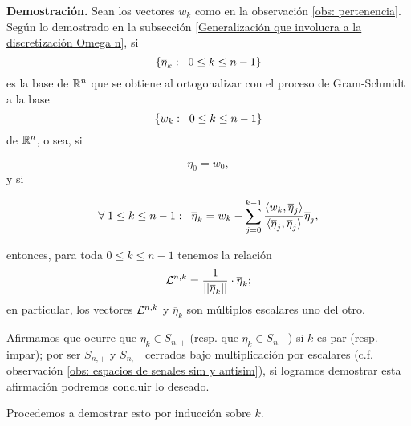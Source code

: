 \noindent
\textbf{Demostración.}
Sean los vectores $w_{k}$ como en la observación 
\ref{obs: pertenencia}.
Según lo demostrado en la subsección 
\ref{Generalización que involucra a la discretización Omega n}, si
\[
\{ \overline{\eta}_{k} : \hspace{0.2cm} 0 \leq k \leq n-1 \}
\]
es la base de $\mathbb{R}^{n}$ que se obtiene al ortogonalizar 
con el proceso de Gram-Schmidt a la base
\[
\{ w_{k} : \hspace{0.2cm} 0 \leq k \leq n-1 \}
\]
de $\mathbb{R}^{n}$,
o sea, si 

\begin{equation}
\label{eq3: 19En}
\overline{\eta}_{0}= w_{0},
\end{equation}
y si

\begin{equation}
\label{eq4: 19En}
\forall \hspace{0.1cm} 1 \leq k \leq n-1: 
\hspace{0.2cm}
\overline{\eta}_{k}= w_{k}-
\suma{j=0}{k-1}{
\frac{\langle w_{k}, \overline{\eta}_{j} \rangle}
{\langle \overline{\eta}_{j}, \overline{\eta}_{j} \rangle}\overline{\eta}_{j},
}
\end{equation}


\noindent
entonces, para toda $0 \leq k \leq n-1$ tenemos la relación 
\[
\mathcal{L}^{n,k}= \frac{1}{||\overline{\eta}_{k}||} \cdot \overline{\eta}_{k};
\]
en particular, los vectores $\mathcal{L}^{n,k}$ y 
$\overline{\eta}_{k}$ son múltiplos escalares uno del otro.

Afirmamos que ocurre que
$\overline{\eta}_{k} \in S_{n,+}$ (resp. que
$\overline{\eta}_{k} \in S_{n,-}$) si $k$ es par
(resp. impar); por ser $S_{n,+}$
y $S_{n,-}$ cerrados bajo multiplicación
por escalares (c.f. observación 
\ref{obs: espacios de senales sim y antisim}),
si logramos demostrar esta afirmación podremos concluir lo deseado.



Procedemos a demostrar esto por inducción sobre $k$.


